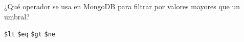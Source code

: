 \question[1] ¿Qué operador se usa en MongoDB para filtrar por valores mayores que un umbral?
\begin{choices}
\choice \texttt{\$lt}
\choice \texttt{\$eq}
\CorrectChoice \texttt{\$gt}
\choice \texttt{\$ne}
\end{choices}